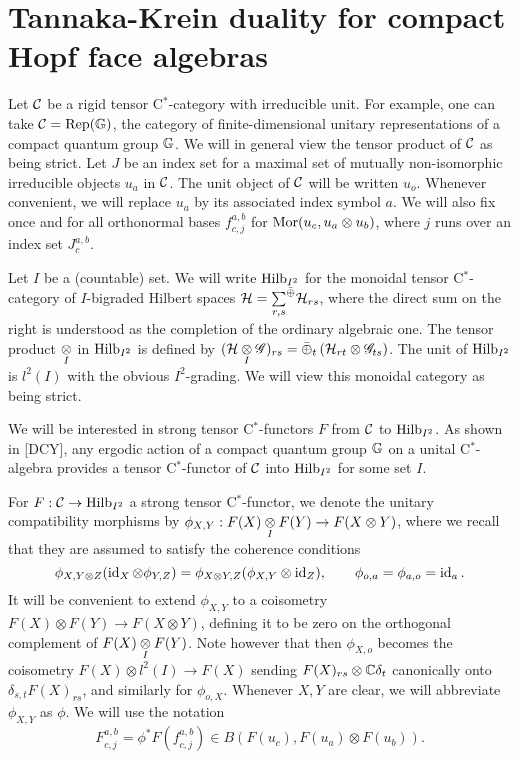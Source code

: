 \section{Tannaka-Krein duality for compact Hopf face algebras}

Let $\mathcal{C}$ be a rigid tensor C$^*$-category with irreducible unit. For example, one can take $\mathcal{C} = \mathrm{Rep}(\mathbb{G})$, the category of finite-dimensional unitary representations of a compact quantum group $\mathbb{G}$. We will in general view the tensor product of $\mathcal{C}$ as being strict. Let $J$ be an index set for a maximal set of mutually non-isomorphic irreducible objects $u_a$ in $\mathcal{C}$. The unit object of $\mathcal{C}$ will be written $u_o$. Whenever convenient, we will replace $u_a$ by its associated index symbol $a$. We will also fix once and for all orthonormal bases $f_{c,j}^{a,b}$ for $\mathrm{Mor}(u_c,u_a\otimes u_b)$, where $j$ runs over an index set $J^{a,b}_{c}$.

Let $I$ be a (countable) set. We will write $\mathrm{Hilb}_{I^2}$ for the monoidal tensor C$^*$-category of $I$-bigraded Hilbert spaces $\mathcal{H} = \underset{r,s}{\sum}^{\bar{\oplus}}\mathcal{H}_{rs}$, where the direct sum on the right is understood as the completion of the ordinary algebraic one. The tensor product $\underset{I}{\otimes}$ in $\mathrm{Hilb}_{I^2}$ is defined by $(\mathcal{H}\underset{I}{\otimes} \mathscr{G})_{rs} = \bar{\oplus}_t \left(\mathcal{H}_{rt}\otimes\mathscr{G}_{ts}\right)$. The unit of $\mathrm{Hilb}_{I^2}$ is $l^2(I)$ with the obvious $I^2$-grading. We will view this monoidal category as being strict.

We will be interested in strong tensor C$^*$-functors $F$ from $\mathcal{C}$ to $\mathrm{Hilb}_{I^2}$. As shown in [DCY], any ergodic action of a compact quantum group $\mathbb{G}$ on a unital C$^*$-algebra provides a tensor C$^*$-functor of $\mathcal{C}$ into $\mathrm{Hilb}_{I^2}$ for some set $I$.

For $F: \mathcal{C}\rightarrow \mathrm{Hilb}_{I^2}$ a strong tensor C$^*$-functor, we denote the unitary compatibility morphisms by $\phi_{X,Y}:F(X)\underset{I}{\otimes} F(Y)\rightarrow F(X\otimes Y)$, where we recall that they are assumed to satisfy the coherence conditions  \[\phi_{X,Y\otimes Z}(\operatorname{id}_X\otimes \phi_{Y,Z}) = \phi_{X\otimes Y,Z}(\phi_{X,Y}\otimes \operatorname{id}_Z),\qquad \phi_{o,a} = \phi_{a,o} = \operatorname{id}_a.\] It will be convenient to extend $\phi_{X,Y}$ to a coisometry $F(X)\otimes F(Y)\rightarrow F(X\otimes Y)$, defining it to be zero on the orthogonal complement of $F(X)\underset{I}{\otimes} F(Y)$. Note however that then $\phi_{X,o}$ becomes the coisometry $F(X)\otimes l^2(I)\rightarrow F(X)$ sending $F(X)_{rs} \otimes \mathbb{C}\delta_t$ canonically onto $\delta_{s,t}F(X)_{rs}$, and similarly for $\phi_{o,X}$. Whenever $X,Y$ are clear, we will abbreviate $\phi_{X,Y}$ as $\phi$. We will use the notation \[F^{a,b}_{c,j} = \phi^* F(f^{a,b}_{c,j}) \in B(F(u_c),F(u_a)\otimes F(u_b)).\]

